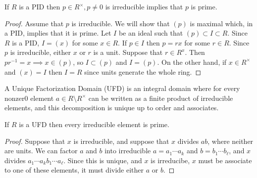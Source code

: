 \begin{proposition}
If $R$ is a PID then $p \in R^\times, p \not= 0$ is irreducible implies that $p$ is prime.
\end{proposition}

\begin{proof}
Assume that $p$ is irreducible. We will show that $(p)$ is maximal which, in a PID, implies that it is prime. Let $I$ be an ideal such that $(p) \subset I \subset R$. Since $R$ is a PID, $I = (x)$ for some $x \in R$. If $p \in I$ then $p = rx$ for some $r \in R$. Since $p$ is irreducible, either $x$ or $r$ is a unit. Suppose that $r \in R^x$. Then $pr^{-1} = x \implies x \in (p)$, so $I \subset (p)$ and $I = (p)$. On the other hand, if $x \in R^\times$ and $(x) = I$ then $I = R$ since units generate the whole ring.
\end{proof}

\begin{definition}
A Unique Factorization Domain (UFD) is an integral domain where for every nonzer0 element $a \in R \setminus R^\times$ can be written as a finite product of irreducible elements, and this decomposition is unique up to order and associates.
\end{definition}

\begin{example}
\end{example}

\begin{proposition}
If $R$ is a UFD then every irreducible element is prime.
\end{proposition}

\begin{proof}
Suppose that $x$ is irreducible, and suppose that $x$ divides $ab$, where neither are units. We can factor $a$ and $b$ into irreducible $a = a_1 \cdots a_k$ and $b = b_1 \cdots b_\ell$, and $x$ divides $a_1 \cdots a_k b_1 \cdots a_\ell$. Since this is unique, and $x$ is irreducibe, $x$ must be associate to one of these elements, it must divide either $a$ or $b$.
\end{proof}

